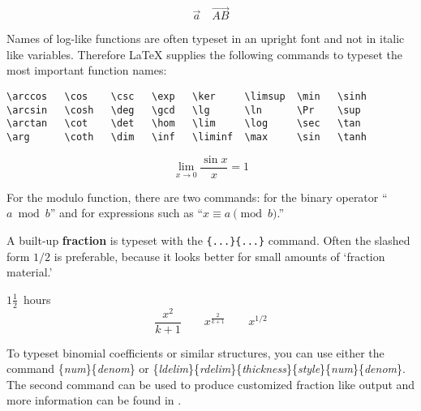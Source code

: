 \begin{singlespace}
\begin{example}
\begin{displaymath}
\vec a\quad\overrightarrow{AB}
\end{displaymath}
\end{example}
\end{singlespace}

Names of log-like functions are often typeset in an upright
font and not in italic like variables. Therefore \LaTeX{} supplies the
following commands to typeset the most important function names:

\begin{singlespace}
\begin{verbatim}
\arccos   \cos    \csc   \exp   \ker     \limsup  \min   \sinh
\arcsin   \cosh   \deg   \gcd   \lg      \ln      \Pr    \sup
\arctan   \cot    \det   \hom   \lim     \log     \sec   \tan
\arg      \coth   \dim   \inf   \liminf  \max     \sin   \tanh
\end{verbatim}
\end{singlespace}

\begin{singlespace}
\begin{example}
\[\lim_{x \rightarrow 0}
\frac{\sin x}{x}=1\]
\end{example}
\end{singlespace}

For the modulo function, there are two commands:  for the
binary operator ``$a \bmod b$'' and 
for expressions
such as ``$x\equiv a \pmod{b}$.''

A built-up \textbf{fraction} is typeset with the
\verb|{...}{...}| command.
Often the slashed form $1/2$ is preferable, because it looks better
for small amounts of `fraction material.'

\begin{singlespace}
\begin{example}
$1\frac{1}{2}$~hours
\begin{displaymath}
\frac{ x^{2} }{ k+1 }\qquad
x^{ \frac{2}{k+1} }\qquad
x^{ 1/2 }
\end{displaymath}
\end{example}
\end{singlespace}

To typeset binomial coefficients or similar structures, you can use
either the command \linebreak {}\{\emph{num}\}\{\emph{denom}\} or \{\emph{ldelim}\}\{\emph{rdelim}\}\{\emph{thickness}\}\{\emph{style}\}\{\emph{num}\}\{\emph{denom}\}. The second command can be used to produce customized fraction like output and more information can be found in \citet{mgbcr04}.

